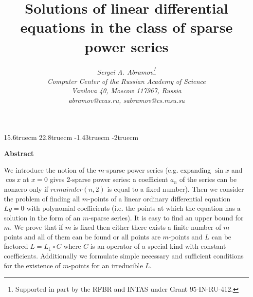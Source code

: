 \pagestyle{empty}

\textwidth15.6truecm
\textheight22.8truecm
\hoffset-1.43truecm
\voffset-2truecm
\newcommand {\ord}{\mathop{\rm ord}}
\newcommand {\lc}{\mathop{\rm lc}}
\newcommand {\rGCD}{\mathop{\rm GCD}}
\newcommand {\qed}{\hfill$\Box$\par\medskip}
\newcommand {\cS} {{\cal S}}
\newcommand {\cR} {{\cal R}}
\newcommand {\cC} {{\cal C}}
\newcommand {\rodtp} {\complex [D,x]}
\newcommand {\rodcp} {\complex [E,E^{-1},n]}
\newtheorem{Theorem}{Theorem}
\newtheorem{Proposition}{Proposition}
\newtheorem{Lemma}{Lemma}
\newtheorem{Example}{Example}
\newtheorem{Corollary}{Corollary}
\def\o{\circ}
\def\complex{\hbox{C\kern -.58em {\raise .54ex \hbox{$\scriptscriptstyle |$}}
  \kern-.55em {\raise .53ex \hbox{$\scriptscriptstyle |$}} }}


\title{\Large\bf Solutions of linear differential equations
in the class of sparse power series}
\author{\large\sl Sergei A. Abramov\thanks{Supported in part by
the RFBR and INTAS under Grant 95-IN-RU-412. } \\
\normalsize Computer Center of the Russian Academy of Science\\
\normalsize  Vavilova 40, Moscow 117967, Russia\\
\normalsize abramov@ccas.ru,
\normalsize sabramov@cs.msu.su
}

\date{}

\maketitle

\begin{center}
\large\bf Abstract
\end{center}

We introduce the notion of the $m$-sparse power series
(e.g. expanding $\sin x$ and $\cos x$ at $x=0$ gives
2-sparse power series: a coefficient $a_n$ of the series
can be nonzero only if $remainder(n,2)$ is equal to a
fixed number). Then we consider the problem of finding all
$m$-points of a linear ordinary differential equation
$Ly=0$ with polynomial coefficients (i.e. the points
at which the equation has a solution in the form of an
$m$-sparse series). It is easy to find an upper bound for $m$.
We prove that if $m$ is fixed then either there exists a finite
number of $m$-points and all of them can be found or all points
are $m$-points and $L$ can be factored $L=L_1 \circ C$ where $C$
is an operator of a special kind with constant coefficients.
Additionally we formulate simple necessary and sufficient
conditions for the existence of $m$-points for an irreducible $L$.

